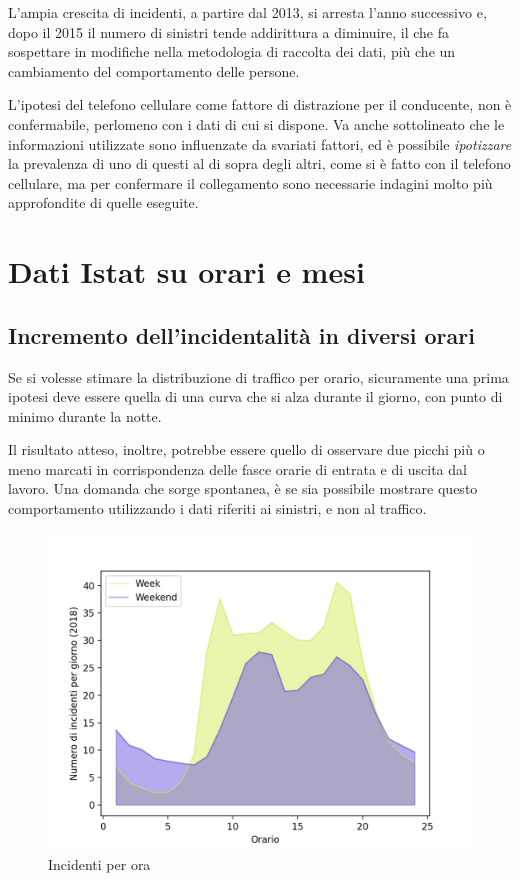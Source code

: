 \documentclass[a4paper,12pt]{report}
\newcommand{\quotestyle}[1]{\textit{#1}}
\begin{document}
L'ampia crescita di incidenti, a partire dal 2013, si arresta l'anno successivo e, 
dopo il 2015 il numero di sinistri tende addirittura a diminuire, 
il che fa sospettare 
in modifiche nella metodologia di raccolta dei dati, più che un cambiamento 
del comportamento delle persone. 

L'ipotesi del telefono cellulare come fattore di distrazione per il conducente, 
non è confermabile, perlomeno con i dati di cui si dispone. 
Va anche sottolineato che le informazioni utilizzate sono influenzate da svariati fattori, ed è 
possibile \quotestyle{ipotizzare} la prevalenza di uno di questi al di sopra degli altri, 
come si è fatto con il telefono cellulare, 
ma per confermare il collegamento sono necessarie indagini molto più approfondite di 
quelle eseguite. 

\section{Dati Istat su orari e mesi}

\subsection{Incremento dell'incidentalità in diversi orari}

Se si volesse stimare la distribuzione di traffico per orario, sicuramente una prima ipotesi 
deve essere quella di una curva che si alza durante il giorno, con 
punto di minimo durante la notte. 

Il risultato atteso, inoltre, potrebbe essere 
quello di osservare due picchi più o meno marcati 
in corrispondenza delle fasce orarie di entrata e di uscita dal lavoro. 
Una domanda che sorge spontanea, 
è se sia possibile mostrare questo comportamento utilizzando i dati 
riferiti ai sinistri, e non al traffico. 

\begin{figure}
    \includegraphics[width=\linewidth]{../src/incidenti/incidenti_senza_coords/ore_punta/week_weekend.png}
    \caption{Incidenti per ora}
    \label{fig:week-weekend}
\end{figure}
\end{document}

